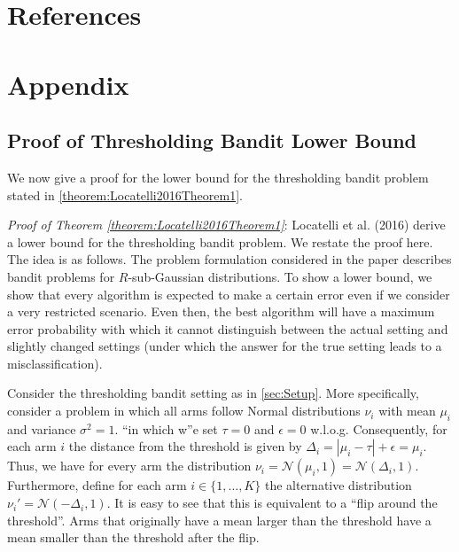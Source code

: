 \documentclass[11pt,]{article}
\begin{document}
\newpage

\section{References}\label{references}

\newpage

\section{Appendix}\label{appendix}

\subsection{\texorpdfstring{Proof of Thresholding Bandit Lower Bound
\label{sec:AppendixAPTLB}}{Proof of Thresholding Bandit Lower Bound }}\label{proof-of-thresholding-bandit-lower-bound}

We now give a proof for the lower bound for the thresholding bandit
problem stated in \autoref{theorem:Locatelli2016Theorem1}.

\emph{Proof of Theorem \ref{theorem:Locatelli2016Theorem1}}: Locatelli
et al. (2016) derive a lower bound for the thresholding bandit problem.
We restate the proof here. The idea is as follows. The problem
formulation considered in the paper describes bandit problems for
\(R\)-sub-Gaussian distributions. To show a lower bound, we show that
every algorithm is expected to make a certain error even if we consider
a very restricted scenario. Even then, the best algorithm will have a
maximum error probability with which it cannot distinguish between the
actual setting and slightly changed settings (under which the answer for
the true setting leads to a misclassification).

Consider the thresholding bandit setting as in \autoref{sec:Setup}. More
specifically, consider a problem in which all arms follow Normal
distributions \(\nu_i\) with mean \(\mu_i\) and variance
\(\sigma^2 = 1\). ``in which w''e set \(\tau = 0\) and \(\epsilon = 0\)
w.l.o.g. Consequently, for each arm \(i\) the distance from the
threshold is given by \(\Delta_i = |\mu_i - \tau| + \epsilon = \mu_i\).
Thus, we have for every arm the distribution
\(\nu_i = \mathcal{N}(\mu_i,1) = \mathcal{N}(\Delta_i,1)\). Furthermore,
define for each arm \(i \in \{1, \dots, K\}\) the alternative
distribution \(\nu_i' = \mathcal{N}(-\Delta_i,1)\). It is easy to see
that this is equivalent to a ``flip around the threshold''. Arms that
originally have a mean larger than the threshold have a mean smaller
than the threshold after the flip.
\end{document}
